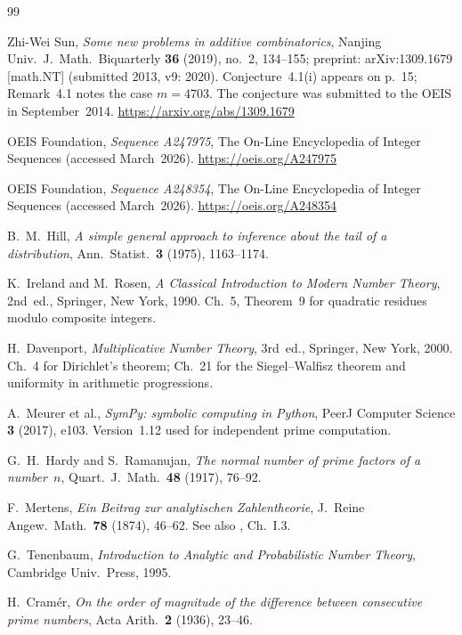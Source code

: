 \documentclass{amsart}
\theoremstyle{definition}
\theoremstyle{remark}
\numberwithin{equation}{section}
\begin{document}

\begin{thebibliography}{99}

	Zhi-Wei Sun,
	\textit{Some new problems in additive combinatorics},
	Nanjing Univ.\ J.\ Math.\ Biquarterly \textbf{36} (2019), no.~2,
	134--155; preprint: arXiv:1309.1679 [math.NT] (submitted 2013,
	v9: 2020).
	Conjecture~4.1(i) appears on p.~15; Remark~4.1 notes the case
	$m = 4703$. The conjecture was submitted to the OEIS in
	September~2014.
	\url{https://arxiv.org/abs/1309.1679}

	OEIS Foundation,
	\textit{Sequence A247975},
	The On-Line Encyclopedia of Integer Sequences
	(accessed March~2026).
	\url{https://oeis.org/A247975}

	OEIS Foundation,
	\textit{Sequence A248354},
	The On-Line Encyclopedia of Integer Sequences
	(accessed March~2026).
	\url{https://oeis.org/A248354}

	B.~M.~Hill,
	\textit{A simple general approach to inference about the tail of a
		distribution},
	Ann.\ Statist.\ \textbf{3} (1975), 1163--1174.

	K.~Ireland and M.~Rosen,
	\textit{A Classical Introduction to Modern Number Theory},
	2nd~ed., Springer, New York, 1990.
	Ch.~5, Theorem~9 for quadratic residues modulo composite integers.

	H.~Davenport,
	\textit{Multiplicative Number Theory},
	3rd~ed., Springer, New York, 2000.
	Ch.~4 for Dirichlet's theorem; Ch.~21 for the Siegel--Walfisz
	theorem and uniformity in arithmetic progressions.

	A.~Meurer et al.,
	\textit{SymPy: symbolic computing in Python},
	PeerJ Computer Science \textbf{3} (2017), e103.
	Version~1.12 used for independent prime computation.

	G.~H.~Hardy and S.~Ramanujan,
	\textit{The normal number of prime factors of a number~$n$},
	Quart.\ J.\ Math.\ \textbf{48} (1917), 76--92.

	F.~Mertens,
	\textit{Ein Beitrag zur analytischen Zahlentheorie},
	J.\ Reine Angew.\ Math.\ \textbf{78} (1874), 46--62.
	See also \cite{Tenenbaum1995}, Ch.~I.3.

	G.~Tenenbaum,
	\textit{Introduction to Analytic and Probabilistic Number Theory},
	Cambridge Univ.\ Press, 1995.

	H.~Cram\'er,
	\textit{On the order of magnitude of the difference between consecutive
		prime numbers},
	Acta Arith.\ \textbf{2} (1936), 23--46.


\end{thebibliography}
\end{document}
